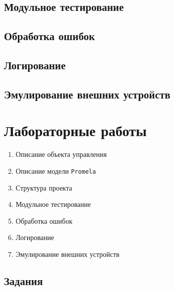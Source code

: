 \documentclass[12pt, twoside]{report}
\begin{document}
\newpage
\section*{Модульное тестирование}\label{practical_work_4}

\newpage
\section*{Обработка ошибок}\label{practical_work_5}

\newpage
\section*{Логирование}\label{practical_work_6}

\newpage
\section*{Эмулирование внешних устройств}\label{practical_work_7}


\newpage
\chapter*{Лабораторные работы}\label{labs_works}

\begin{enumerate}
  \item Описание объекта управления
  \item Описание модели \texttt{Promela}
  \item Структура проекта
  \item Модульное тестирование 
  \item Обработка ошибок
  \item Логирование
  \item Эмулирование внешних устройств
\end{enumerate}

\section*{Задания}\label{lab_work_formatting}
\end{document}
